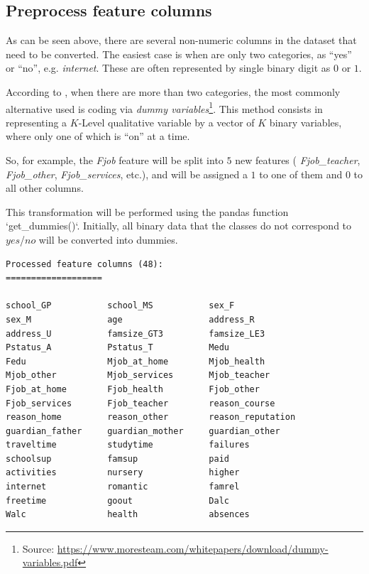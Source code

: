 \documentclass[a4paper]{article}
\begin{document}
\subsection{Preprocess feature columns}
As can be seen above, there are several non-numeric columns in the dataset that need to be converted. The easiest case is when are only two categories, as ``yes'' or ``no'', e.g. \textit{internet}. These are often represented by single binary digit as $0$ or $1$.

According to \cite{Hastie_2009}, when there are more than two categories, the most commonly alternative used is coding via \textit{dummy variables}\footnote{Source: \url{https://www.moresteam.com/whitepapers/download/dummy-variables.pdf}}. This method consists in representing a $K$-Level qualitative variable by a vector of $K$ binary variables, where only one of which is ``on'' at a time.

So, for example, the \textit{Fjob} feature will be split into $5$ new features ( \textit{Fjob\_teacher}, \textit{Fjob\_other}, \textit{Fjob\_services}, etc.), and will be assigned a $1$ to one of them and $0$ to all other columns.

This transformation will be performed using the pandas function `get\_dummies()`. Initially, all binary data that the classes do not correspond to $yes$/$no$ will be converted into dummies.

\begin{lstlisting}
Processed feature columns (48):
===================

school_GP         	school_MS         	sex_F             
sex_M             	age               	address_R         
address_U         	famsize_GT3       	famsize_LE3       
Pstatus_A         	Pstatus_T         	Medu              
Fedu              	Mjob_at_home      	Mjob_health       
Mjob_other        	Mjob_services     	Mjob_teacher      
Fjob_at_home      	Fjob_health       	Fjob_other        
Fjob_services     	Fjob_teacher      	reason_course     
reason_home       	reason_other      	reason_reputation 
guardian_father   	guardian_mother   	guardian_other    
traveltime        	studytime         	failures          
schoolsup         	famsup            	paid              
activities        	nursery           	higher            
internet          	romantic          	famrel            
freetime          	goout             	Dalc              
Walc              	health            	absences  
\end{lstlisting}
\end{document}
